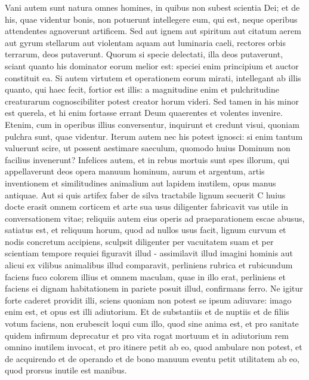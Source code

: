\begin{biblechapter}
\begin{biblechapter}
\begin{biblechapter}
\begin{biblechapter}
\begin{biblechapter}
\begin{biblechapter}
\begin{biblechapter}
\begin{biblechapter}
\begin{biblechapter}
\begin{biblechapter}
\begin{biblechapter}
\begin{biblechapter}
\begin{biblechapter}
\verse Vani autem sunt natura omnes homines,
 in quibus non subest scientia Dei;
 et de his, quae videntur bonis,
 non potuerunt intellegere eum, qui est,
 neque operibus attendentes agnoverunt artificem.
 \verse Sed aut ignem aut spiritum aut citatum aerem
 aut gyrum stellarum aut violentam aquam aut luminaria caeli,
 rectores orbis terrarum, deos putaverunt.
 \verse Quorum si specie delectati, illa deos putaverunt,
 sciant quanto his dominator eorum melior est:
 speciei enim principium et auctor constituit ea.
 \verse Si autem virtutem et operationem eorum mirati,
 intellegant ab illis quanto, qui haec fecit, fortior est illis:
 \verse a magnitudine enim et pulchritudine creaturarum
 cognoscibiliter potest creator horum videri.
 \verse Sed tamen in his minor est querela, et hi enim fortasse errant
 Deum quaerentes et volentes invenire.
 \verse Etenim, cum in operibus illius conversentur, inquirunt
 et credunt visui,
 quoniam pulchra sunt, quae videntur.
 \verse Iterum autem nec his potest ignosci:
 \verse si enim tantum valuerunt scire, ut possent aestimare saeculum,
 quomodo huius Dominum non facilius invenerunt?
 \verse Infelices autem, et in rebus mortuis sunt spes illorum,
 qui appellaverunt deos opera manuum hominum,
 aurum et argentum, artis inventionem
 et similitudines animalium
 aut lapidem inutilem, opus manus antiquae.
 \verse Aut si quis artifex faber de silva tractabile lignum secuerit
 C huius docte erasit omnem corticem
 et arte sua usus diligenter
 fabricavit vas utile in conversationem vitae;
 \verse reliquiis autem eius operis
 ad praeparationem escae abusus, satiatus est,
 \verse et reliquum horum, quod ad nullos usus facit,
 lignum curvum et nodis concretum accipiens,
 sculpsit diligenter per vacuitatem suam
 et per scientiam tempore requiei figuravit illud -
 assimilavit illud imagini hominis
 \verse aut alicui ex vilibus animalibus illud comparavit,
 perliniens rubrica et rubicundum faciens fuco colorem illius
 et omnem maculam, quae in illo erat, perliniens
 \verse et faciens ei dignam habitationem
 in pariete posuit illud, confirmans ferro.
 \verse Ne igitur forte caderet providit illi,
 sciens quoniam non potest se ipsum adiuvare:
 imago enim est, et opus est illi adiutorium.
 \verse Et de substantiis et de nuptiis et de filiis votum faciens,
 non erubescit loqui cum illo, quod sine anima est,
 et pro sanitate quidem infirmum deprecatur
 \verse et pro vita rogat mortuum
 et in adiutorium rem omnino inutilem invocat,
 et pro itinere petit ab eo, quod ambulare non potest,
 \verse et de acquirendo et de operando et de bono manuum eventu
 petit utilitatem ab eo, quod prorsus inutile est manibus.
 

\end{biblechapter}
\end{biblechapter}
\end{biblechapter}
\end{biblechapter}
\end{biblechapter}
\end{biblechapter}
\end{biblechapter}
\end{biblechapter}
\end{biblechapter}
\end{biblechapter}
\end{biblechapter}
\end{biblechapter}
\end{biblechapter}
